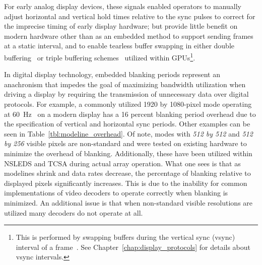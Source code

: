     For early analog display devices, these signals enabled operators to manually adjust horizontal and vertical hold times relative to the sync pulses to correct for the imprecise timing of early display hardware; but provide little benefit on modern hardware other than as an embedded method to support sending frames at a static interval, and to enable tearless buffer swapping in either double buffering~\cite{FriedbergEtAl1990} or triple buffering schemes~\cite{3dfx1997} utilized within GPUs\footnote{This is performed by swapping buffers during the vertical sync (vsync) interval of a frame~\cite{3dfx1999,3dfx1999_2}. See Chapter~\ref{chap:display_protocols} for details about vsync intervals.}.

    In digital display technology, embedded blanking periods represent an anachronism that impedes the goal of maximizing bandwidth utilization when driving a display by requiring the transmission of unnecessary data over digital protocols. For example, a commonly utilized 1920 by 1080-pixel mode operating at \mbox{60 Hz}~\cite{MythTV2015} on a modern display has a 16 percent blanking period overhead due to the specification of vertical and horizontal sync periods. Other examples can be seen in Table~\ref{tbl:modeline_overhead}. Of note, modes with {\it 512 by 512} and {\it 512 by 256} visible pixels are non-standard and were tested on existing hardware to minimize the overhead of blanking. Additionally, these have been utilized within NSLEDS and TCSA during actual array operation. What one sees is that as modelines shrink and data rates decrease, the percentage of blanking relative to displayed pixels significantly increases. This is due to the inability for common implementations of video decoders to operate correctly when blanking is minimized. An additional issue is that when non-standard visible resolutions are utilized many decoders do not operate at all.

